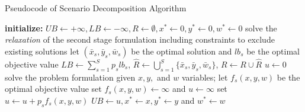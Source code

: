 \documentclass[aspectratio=169]{beamer}
\begin{document}
\begin{frame}{Pseudocode of Scenario Decomposition Algorithm}
\vspace{-10pt}
    \begin{algorithm}[H]
        \caption{Scenario decomposition algorithm} \label{alg:SDA}
        \begin{algorithmic}[1]
        \tiny
        \State \textbf{initialize:} $UB \gets +\infty, LB \gets -\infty, R \gets \emptyset, x^* \gets 0, y^* \gets 0, w^* \gets 0$
                \State solve the \textit{relaxation} of the second stage formulation including constraints to exclude existing solutions
                \State let $(\bar{x}_s, \bar{y}_s, \bar{w}_s)$ be the optimal solution and $lb_s$ be the optimal objective value
            \EndFor
            \State $LB \gets \sum_{s=1}^S p_s lb_s$, $\hat{R} \gets \bigcup_{s=1}^S \{\bar{x}_s, \bar{y}_s, \bar{w}_s\}$, $R \gets R \cup \hat{R}$
                \State $u \gets 0$
                    \State solve the problem formulation given $x, y,$ and $w$ variables; let $f_s(x, y, w)$ be the optimal objective value
                        \State set $f_s(x, y, w) \gets \infty$ and $u \gets \infty$
                    \Else
                        \State set $u \gets u + p_s f_s(x, y, w)$
                    \EndIf
                \EndFor
                    \State $UB \gets u, x^* \gets x, y^* \gets y$ and $w^* \gets w$
                \EndIf
            \EndFor
        \EndWhile
        \end{algorithmic}
    \end{algorithm}
\end{frame}
\end{document}
